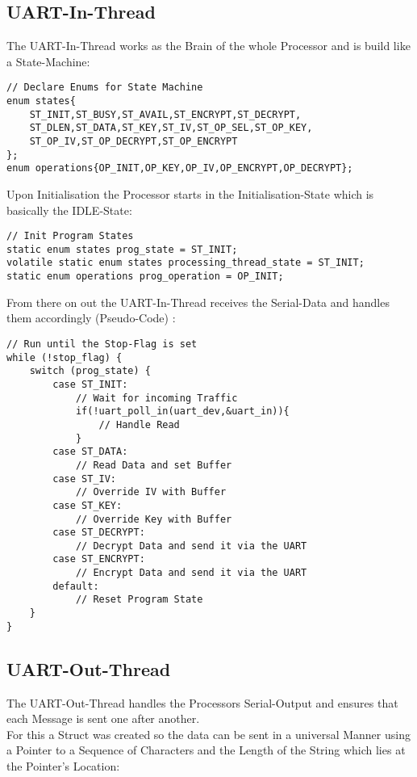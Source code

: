 \subsection{UART-In-Thread}

The UART-In-Thread works as the Brain of the whole Processor and is build
like a State-Machine:

\begin{lstlisting}[style=CStyle,caption=State Definitions]
// Declare Enums for State Machine
enum states{
	ST_INIT,ST_BUSY,ST_AVAIL,ST_ENCRYPT,ST_DECRYPT,
	ST_DLEN,ST_DATA,ST_KEY,ST_IV,ST_OP_SEL,ST_OP_KEY,
	ST_OP_IV,ST_OP_DECRYPT,ST_OP_ENCRYPT
};
enum operations{OP_INIT,OP_KEY,OP_IV,OP_ENCRYPT,OP_DECRYPT};
\end{lstlisting}

Upon Initialisation the Processor starts in the Initialisation-State which
is basically the IDLE-State:

\begin{lstlisting}
// Init Program States
static enum states prog_state = ST_INIT;
volatile static enum states processing_thread_state = ST_INIT;
static enum operations prog_operation = OP_INIT;
\end{lstlisting}

\pagebreak

From there on out the UART-In-Thread receives the Serial-Data and
handles them accordingly (Pseudo-Code) :

\begin{lstlisting}[style=CStyle,caption=State Machine Pseudo-Code]
// Run until the Stop-Flag is set
while (!stop_flag) {
	switch (prog_state) {
		case ST_INIT:
            // Wait for incoming Traffic
            if(!uart_poll_in(uart_dev,&uart_in)){
				// Handle Read
			}
	    case ST_DATA:
			// Read Data and set Buffer
	    case ST_IV:
			// Override IV with Buffer
	    case ST_KEY:
			// Override Key with Buffer
	    case ST_DECRYPT:
			// Decrypt Data and send it via the UART
	    case ST_ENCRYPT:
			// Encrypt Data and send it via the UART
	    default:
			// Reset Program State
	}
}
\end{lstlisting}

\pagebreak

\subsection{UART-Out-Thread}

The UART-Out-Thread handles the Processors Serial-Output and ensures
that each Message is sent one after another.
\\
For this a Struct was created so the data can be sent in a universal
Manner using a Pointer to a Sequence of Characters and the Length of
the String which lies at the Pointer's Location:

